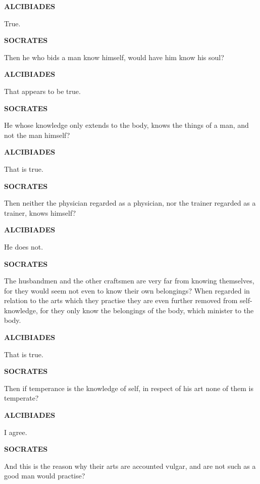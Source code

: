 \documentclass[11pt,letter]{article}
\begin{document}
\par \textbf{ALCIBIADES}
\par   True.

\par \textbf{SOCRATES}
\par   Then he who bids a man know himself, would have him know his soul?

\par \textbf{ALCIBIADES}
\par   That appears to be true.

\par \textbf{SOCRATES}
\par   He whose knowledge only extends to the body, knows the things of a man, and not the man himself?

\par \textbf{ALCIBIADES}
\par   That is true.

\par \textbf{SOCRATES}
\par   Then neither the physician regarded as a physician, nor the trainer regarded as a trainer, knows himself?

\par \textbf{ALCIBIADES}
\par   He does not.

\par \textbf{SOCRATES}
\par   The husbandmen and the other craftsmen are very far from knowing themselves, for they would seem not even to know their own belongings? When regarded in relation to the arts which they practise they are even further removed from self-knowledge, for they only know the belongings of the body, which minister to the body.

\par \textbf{ALCIBIADES}
\par   That is true.

\par \textbf{SOCRATES}
\par   Then if temperance is the knowledge of self, in respect of his art none of them is temperate?

\par \textbf{ALCIBIADES}
\par   I agree.

\par \textbf{SOCRATES}
\par   And this is the reason why their arts are accounted vulgar, and are not such as a good man would practise?
\end{document}
